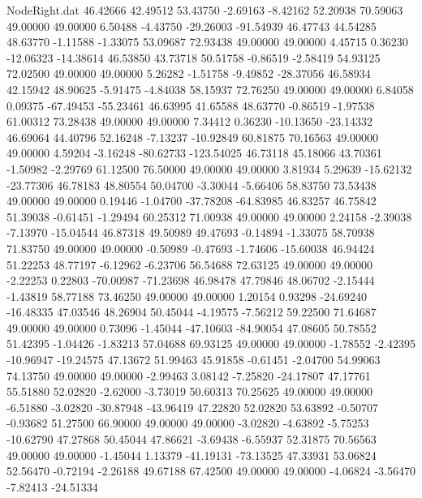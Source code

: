 \begin{filecontents}{NodeRight.dat}
  46.42666   42.49512   53.43750    -2.69163   -8.42162   52.20938   70.59063   49.00000   49.00000    6.50488   -4.43750  -29.26003  -91.54939
  46.47743   44.54285   48.63770    -1.11588   -1.33075   53.09687   72.93438   49.00000   49.00000    4.45715    0.36230  -12.06323  -14.38614
  46.53850   43.73718   50.51758    -0.86519   -2.58419   54.93125   72.02500   49.00000   49.00000    5.26282   -1.51758   -9.49852  -28.37056
  46.58934   42.15942   48.90625    -5.91475   -4.84038   58.15937   72.76250   49.00000   49.00000    6.84058    0.09375  -67.49453  -55.23461
  46.63995   41.65588   48.63770    -0.86519   -1.97538   61.00312   73.28438   49.00000   49.00000    7.34412    0.36230  -10.13650  -23.14332
  46.69064   44.40796   52.16248    -7.13237  -10.92849   60.81875   70.16563   49.00000   49.00000    4.59204   -3.16248  -80.62733 -123.54025
  46.73118   45.18066   43.70361    -1.50982   -2.29769   61.12500   76.50000   49.00000   49.00000    3.81934    5.29639  -15.62132  -23.77306
  46.78183   48.80554   50.04700    -3.30044   -5.66406   58.83750   73.53438   49.00000   49.00000    0.19446   -1.04700  -37.78208  -64.83985
  46.83257   46.75842   51.39038    -0.61451   -1.29494   60.25312   71.00938   49.00000   49.00000    2.24158   -2.39038   -7.13970  -15.04544
  46.87318   49.50989   49.47693    -0.14894   -1.33075   58.70938   71.83750   49.00000   49.00000   -0.50989   -0.47693   -1.74606  -15.60038
  46.94424   51.22253   48.77197    -6.12962   -6.23706   56.54688   72.63125   49.00000   49.00000   -2.22253    0.22803  -70.00987  -71.23698
  46.98478   47.79846   48.06702    -2.15444   -1.43819   58.77188   73.46250   49.00000   49.00000    1.20154    0.93298  -24.69240  -16.48335
  47.03546   48.26904   50.45044    -4.19575   -7.56212   59.22500   71.64687   49.00000   49.00000    0.73096   -1.45044  -47.10603  -84.90054
  47.08605   50.78552   51.42395    -1.04426   -1.83213   57.04688   69.93125   49.00000   49.00000   -1.78552   -2.42395  -10.96947  -19.24575
  47.13672   51.99463   45.91858    -0.61451   -2.04700   54.99063   74.13750   49.00000   49.00000   -2.99463    3.08142   -7.25820  -24.17807
  47.17761   55.51880   52.02820    -2.62000   -3.73019   50.60313   70.25625   49.00000   49.00000   -6.51880   -3.02820  -30.87948  -43.96419
  47.22820   52.02820   53.63892    -0.50707   -0.93682   51.27500   66.90000   49.00000   49.00000   -3.02820   -4.63892   -5.75253  -10.62790
  47.27868   50.45044   47.86621    -3.69438   -6.55937   52.31875   70.56563   49.00000   49.00000   -1.45044    1.13379  -41.19131  -73.13525
  47.33931   53.06824   52.56470    -0.72194   -2.26188   49.67188   67.42500   49.00000   49.00000   -4.06824   -3.56470   -7.82413  -24.51334

\end{filecontents}
